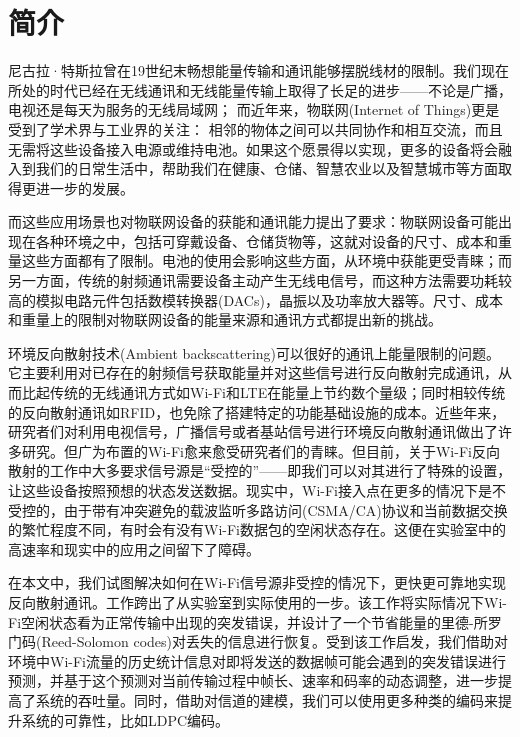 
\chapter{简介}
\label{chap:introduction}

尼古拉·特斯拉曾在19世纪末畅想能量传输和通讯能够摆脱线材的限制。我们现在所处的时代已经在无线通讯和无线能量传输上取得了长足的进步——不论是广播，电视还是每天为服务的无线局域网；
而近年来，物联网(Internet of Things)更是受到了学术界与工业界的关注：
相邻的物体之间可以共同协作和相互交流，而且无需将这些设备接入电源或维持电池\cite{}。如果这个愿景得以实现，更多的设备将会融入到我们的日常生活中，帮助我们在健康、仓储、智慧农业以及智慧城市等方面取得更进一步的发展\cite{}。

而这些应用场景也对物联网设备的获能和通讯能力提出了要求：物联网设备可能出现在各种环境之中，包括可穿戴设备\cite{}、仓储货物\cite{}等，这就对设备的尺寸、成本和重量这些方面都有了限制。电池的使用会影响这些方面，从环境中获能更受青睐；而另一方面，传统的射频通讯需要设备主动产生无线电信号，而这种方法需要功耗较高的模拟电路元件包括数模转换器(DACs)，晶振以及功率放大器等\cite{}。尺寸、成本和重量上的限制对物联网设备的能量来源和通讯方式都提出新的挑战。

环境反向散射技术(Ambient backscattering)可以很好的通讯上能量限制的问题。它主要利用对已存在的射频信号获取能量并对这些信号进行反向散射完成通讯，从而比起传统的无线通讯方式如Wi-Fi和LTE在能量上节约数个量级；同时相较传统的反向散射通讯如RFID，也免除了搭建特定的功能基础设施的成本\cite{}。近些年来，研究者们对利用电视信号\cite{}，广播信号\cite{}或者基站信号\cite{}进行环境反向散射通讯做出了许多研究。但广为布置的Wi-Fi愈来愈受研究者们的青睐。但目前，关于Wi-Fi反向散射的工作中大多要求信号源是“受控的”——即我们可以对其进行了特殊的设置，让这些设备按照预想的状态发送数据。现实中，Wi-Fi接入点在更多的情况下是不受控的，由于带有冲突避免的载波监听多路访问(CSMA/CA)协议和当前数据交换的繁忙程度不同，有时会有没有Wi-Fi数据包的空闲状态存在。这便在实验室中的高速率和现实中的应用之间留下了障碍。


在本文中，我们试图解决如何在Wi-Fi信号源非受控的情况下，更快更可靠地实现反向散射通讯。工作\cite{}跨出了从实验室到实际使用的一步。该工作将实际情况下Wi-Fi空闲状态看为正常传输中出现的突发错误，并设计了一个节省能量的里德-所罗门码(Reed-Solomon codes)对丢失的信息进行恢复。受到该工作启发，我们借助对环境中Wi-Fi流量的历史统计信息对即将发送的数据帧可能会遇到的突发错误进行预测，并基于这个预测对当前传输过程中帧长、速率和码率的动态调整，进一步提高了系统的吞吐量。同时，借助对信道的建模，我们可以使用更多种类的编码来提升系统的可靠性，比如LDPC编码。

